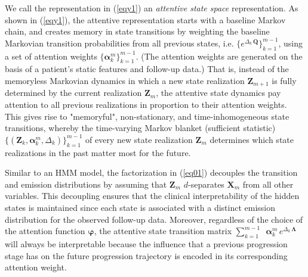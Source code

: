 \documentclass[twoside,11pt]{article}
\begin{document}
We call the representation in (\ref{eqy1}) an {\it attentive state space} representation. As shown in (\ref{eqy1}), the attentive representation starts with a baseline Markov chain, and creates memory in state transitions by weighting the baseline Markovian transition probabilities from all previous states, i.e. \mbox{\footnotesize $\{e^{\Delta_k \, \boldsymbol{Q}}\}^{m-1}_{k=1}$}, using a set of attention weights \mbox{\footnotesize $\{\boldsymbol{\alpha}^m_k\}^{m-1}_{k=1}$}. (The attention weights are generated on the basis of a patient's static features and follow-up data.) That is, instead of the memoryless Markovian dynamics in which a new state realization \mbox{\footnotesize $\boldsymbol{Z}_{m+1}$} is fully determined by the current realization \mbox{\footnotesize $\boldsymbol{Z}_{m}$}, the attentive state dynamics pay attention to all previous realizations in proportion to their attention weights. This gives rise to "memoryful", non-stationary, and time-inhomogeneous state transitions, whereby the time-varying Markov blanket (sufficient statistic) \mbox{\footnotesize $\{(\boldsymbol{Z}_k,\boldsymbol{\alpha}^m_k,\Delta_k)\}^{m-1}_{k=1}$} of every new state realization \mbox{\footnotesize $\boldsymbol{Z}_{m}$} determines which state realizations in the past matter most for the future.  

Similar to an HMM model, the factorization in (\ref{eq01}) decouples the transition and emission distributions by assuming that \mbox{\footnotesize $\boldsymbol{Z}_m$} $d$-separates \mbox{\footnotesize $\boldsymbol{X}_m$} from all other variables. This decoupling ensures that the clinical interpretability of the hidden states is maintained since each state is associated with a distinct emission distribution for the observed follow-up data. Moreover, regardless of the choice of the attention function \mbox{\footnotesize $\boldsymbol{\varphi}$}, the attentive state transition matrix \mbox{\footnotesize $\sum_{k=1}^{m-1}\,\,\, \boldsymbol{\alpha}^m_k \,e^{\Delta_k \, \boldsymbol{\Lambda}}$} will always be interpretable because the influence that a previous progression stage has on the future progression trajectory is encoded in its corresponding attention weight. 
\end{document}
